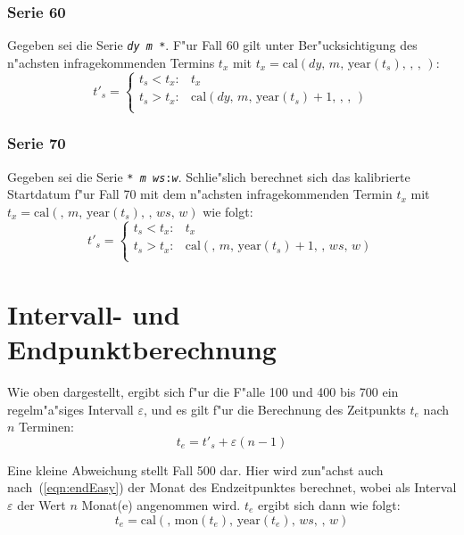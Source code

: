 \documentclass[a4paper]{article}
\newcommand*{\monf}{\mathrm{mon}}
\newcommand*{\yearf}{\mathrm{year}}
\newcommand*{\calf}{\mathrm{cal}}
\numberwithin{equation}{section}
\begin{document}
\subsubsection{Serie 60}
Gegeben sei die Serie \texttt{\textit{dy} \textit{m} *}. F"ur Fall 60 gilt
unter Ber"ucksichtigung des n"achsten infragekommenden Termins $t_x$ mit
$t_x = \calf(dy,\,m,\,\yearf(t_s),\,,\,,\,)$:
\begin{equation}
  t'_s = \left\{\begin{array}{ll}
    t_s < t_x : & t_x \\
    t_s > t_x : & \calf(dy,\,m,\,\yearf(t_s) + 1,\,,\,,\,) \\
  \end{array}\right.
\end{equation}

\subsubsection{Serie 70}
Gegeben sei die Serie \texttt{* \textit{m} \textit{ws}:\textit{w}}. Schlie"slich
berechnet sich das kalibrierte Startdatum f"ur Fall 70 mit dem n"achsten
infragekommenden Termin $t_x$ mit $t_x = \calf(,\,m,\,\yearf(t_s),\,,\,ws,\,w)$
wie folgt:
\begin{equation}
  t'_s = \left\{\begin{array}{ll}
    t_s < t_x : & t_x \\
    t_s > t_x : & \calf(,\,m,\,\yearf(t_s) + 1,\,,\,ws,\,w) \\
  \end{array}\right.
\end{equation}



%
%
%
%
\section{Intervall- und Endpunktberechnung}
\noindent Wie oben dargestellt, ergibt sich f"ur die F"alle 100 und 400 bis 700
ein regelm"a"siges Intervall $\varepsilon$, und es gilt f"ur die Berechnung des
Zeitpunkts $t_e$ nach $n$ Terminen:
\begin{equation}\label{eqn:endEasy}
  t_e = t'_s + \varepsilon(n - 1)
\end{equation}

\noindent Eine kleine Abweichung stellt Fall 500 dar. Hier wird zun"achst auch
nach~(\ref{eqn:endEasy}) der Monat des Endzeitpunktes berechnet, wobei als
Interval $\varepsilon$ der Wert $n$ Monat(e) angenommen wird. $t_e$ ergibt sich
dann wie folgt:
\begin{equation}t_e = \calf(,\,\monf(t_e),\,\yearf(t_e),\,ws,\,,\,w)\end{equation}
\end{document}
